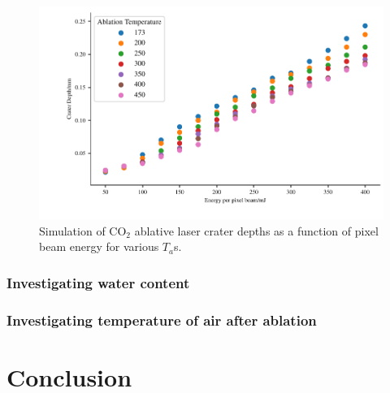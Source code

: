 \begin{figure}
	\centering
    \includegraphics[width=\columnwidth]{./ablation/images/ta.pdf}
    \caption{Simulation of CO$_2$ ablative laser crater depths as a function of pixel beam energy for various $T_a$s.}\label{fig:ta}
\end{figure}
 

\subsubsection*{Investigating water content}
 
\subsubsection*{Investigating temperature of air after ablation} 
 
\section{Conclusion}